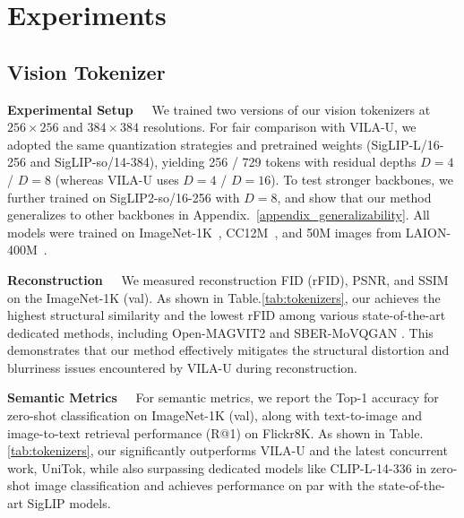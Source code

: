 \section{Experiments}
\label{experiment}



\subsection{Vision Tokenizer}
\label{sec:exp_tokenizer}

\textbf{Experimental Setup~~} We trained two versions of our vision tokenizers at $256 \times 256$ and $384 \times 384$ resolutions. For fair comparison with VILA-U, we adopted the same quantization strategies and pretrained weights (SigLIP-L/16-256 and SigLIP-so/14-384), yielding 256 / 729 tokens with residual depths $D=4$ / $D=8$ (whereas VILA-U uses $D=4$ / $D=16$). To test stronger backbones, we further trained on SigLIP2-so/16-256 with $D=8$, and show that our method generalizes to other backbones in Appendix.~\ref{appendix_generalizability}. All models were trained on ImageNet-1K~\citep{deng2009imagenet}, CC12M~\citep{changpinyo2021cc12m}, and 50M images from LAION-400M~\citep{schuhmann2021laion400m}.

\textbf{Reconstruction~~} We measured reconstruction FID (rFID), PSNR, and SSIM on the ImageNet-1K (val). As shown in Table.\ref{tab:tokenizers}, our \ours{} achieves the highest structural similarity and the lowest rFID among various state-of-the-art dedicated methods, including Open-MAGVIT2 \citep{luo2024openmagvit2} and SBER-MoVQGAN \citep{sber2023movqgan}. This demonstrates that our method effectively mitigates the structural distortion and blurriness issues encountered by VILA-U during reconstruction.

\textbf{Semantic Metrics~~} For semantic metrics, we report the Top-1 accuracy for zero-shot classification on ImageNet-1K (val), along with text-to-image and image-to-text retrieval performance (R@1) on Flickr8K.
As shown in Table.\ref{tab:tokenizers}, our \ours{} significantly outperforms VILA-U and the latest concurrent work, UniTok, while also surpassing dedicated models like CLIP-L-14-336 in zero-shot image classification and achieves performance on par with the state-of-the-art SigLIP models.

